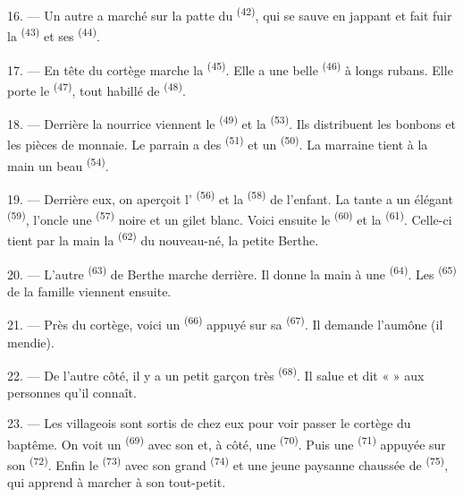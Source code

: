 16. --- Un autre a marché sur la patte du  \textsuperscript{(42)},
qui se sauve en jappant et fait fuir la  \textsuperscript{(43)} et
ses  \textsuperscript{(44)}.

\VUsaut{5.0mm}
\VUsaut{4.0mm}

17. --- En tête du cortège marche la  \textsuperscript{(45)}.
Elle a une belle  \textsuperscript{(46)} à longs rubans. Elle
porte le  \textsuperscript{(47)}, tout habillé de
 \textsuperscript{(48)}.

18. --- Derrière la nourrice viennent le 
\textsuperscript{(49)} et la  \textsuperscript{(53)}. Ils
distribuent les bonbons et les pièces de monnaie. Le parrain a des
 \textsuperscript{(51)} et un 
\textsuperscript{(50)}. La marraine tient à la main un beau 
\textsuperscript{(54)}.

19. --- Derrière eux, on aperçoit l' \textsuperscript{(56)} et la
 \textsuperscript{(58)} de l'enfant. La tante a un élégant
 \textsuperscript{(59)}, l'oncle une 
\textsuperscript{(57)} noire et un gilet blanc. Voici ensuite le
 \textsuperscript{(60)} et la 
\textsuperscript{(61)}. Celle-ci tient par la main la 
\textsuperscript{(62)} du nouveau-né, la petite Berthe.

20. --- L'autre  \textsuperscript{(63)} de Berthe marche
derrière. Il donne la main à une  \textsuperscript{(64)}. Les
 \textsuperscript{(65)} de la famille viennent ensuite.

\VUsaut{4.6mm}
\VUsaut{3.4mm}

21. --- Près du cortège, voici un  \textsuperscript{(66)}
appuyé sur sa  \textsuperscript{(67)}. Il demande l'aumône (il
mendie).

22. --- De l'autre côté, il y a un petit garçon très 
\textsuperscript{(68)}. Il salue et dit «  » aux personnes
qu'il connaît.

23. --- Les villageois sont sortis de chez eux pour voir passer le cortège du
baptême. On voit un  \textsuperscript{(69)} avec son
 et, à côté, une 
\textsuperscript{(70)}. Puis une  \textsuperscript{(71)}
appuyée sur son  \textsuperscript{(72)}. Enfin le
 \textsuperscript{(73)} avec son grand  \textsuperscript{(74)} et une jeune paysanne chaussée de 
\textsuperscript{(75)}, qui apprend à marcher à son tout-petit.

